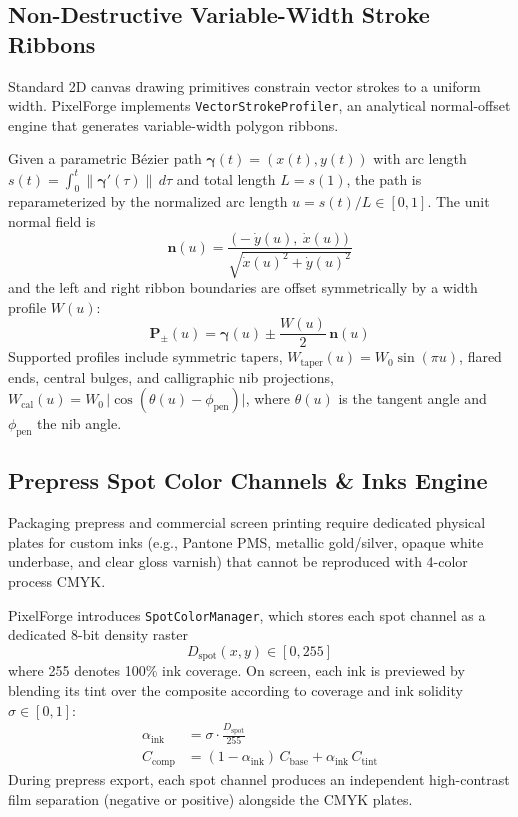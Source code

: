 \documentclass[10pt,journal,compsoc]{IEEEtran}
\begin{document}
\subsection{Non-Destructive Variable-Width Stroke Ribbons}
Standard 2D canvas drawing primitives constrain vector strokes to a uniform width. PixelForge implements \texttt{VectorStrokeProfiler}, an analytical normal-offset engine that generates variable-width polygon ribbons.

Given a parametric Bézier path $\boldsymbol{\gamma}(t) = (x(t), y(t))$ with arc length $s(t) = \int_0^t \|\boldsymbol{\gamma}'(\tau)\|\, d\tau$ and total length $L = s(1)$, the path is reparameterized by the normalized arc length $u = s(t)/L \in [0, 1]$. The unit normal field is
\begin{equation}
\mathbf{n}(u) = \frac{\big(-\dot{y}(u),\ \dot{x}(u)\big)}{\sqrt{\dot{x}(u)^2 + \dot{y}(u)^2}}
\end{equation}
and the left and right ribbon boundaries are offset symmetrically by a width profile $W(u)$:
\begin{equation}
\mathbf{P}_{\pm}(u) = \boldsymbol{\gamma}(u) \pm \frac{W(u)}{2}\, \mathbf{n}(u)
\end{equation}
Supported profiles include symmetric tapers, $W_{\text{taper}}(u) = W_0 \sin(\pi u)$, flared ends, central bulges, and calligraphic nib projections, $W_{\text{cal}}(u) = W_0 \,\lvert\cos(\theta(u) - \phi_{\text{pen}})\rvert$, where $\theta(u)$ is the tangent angle and $\phi_{\text{pen}}$ the nib angle.

\subsection{Prepress Spot Color Channels \& Inks Engine}
Packaging prepress and commercial screen printing require dedicated physical plates for custom inks (e.g., Pantone PMS, metallic gold/silver, opaque white underbase, and clear gloss varnish) that cannot be reproduced with 4-color process CMYK.

PixelForge introduces \texttt{SpotColorManager}, which stores each spot channel as a dedicated 8-bit density raster
\begin{equation}
D_{\text{spot}}(x, y) \in [0, 255]
\end{equation}
where 255 denotes 100\% ink coverage. On screen, each ink is previewed by blending its tint over the composite according to coverage and ink solidity $\sigma \in [0, 1]$:
\begin{align}
\alpha_{\text{ink}} &= \sigma \cdot \frac{D_{\text{spot}}}{255} \\
C_{\text{comp}} &= (1 - \alpha_{\text{ink}})\, C_{\text{base}} + \alpha_{\text{ink}}\, C_{\text{tint}}
\end{align}
During prepress export, each spot channel produces an independent high-contrast film separation (negative or positive) alongside the CMYK plates.
\end{document}
